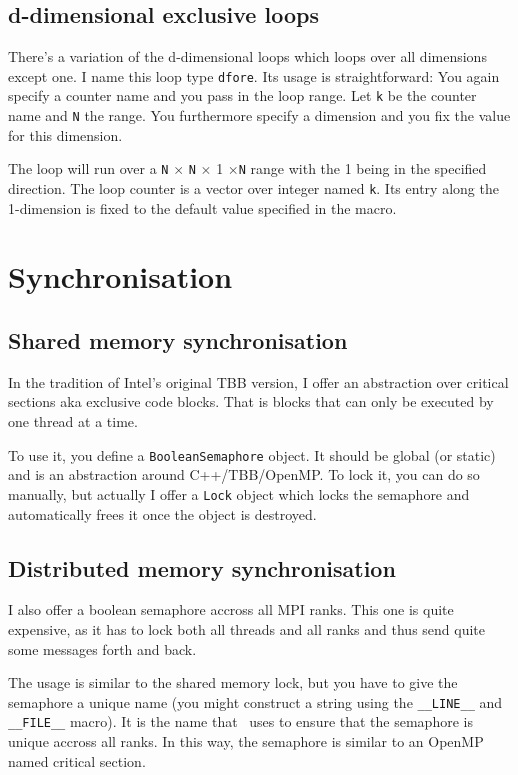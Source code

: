 \subsection{d-dimensional exclusive loops}

There's a variation of the d-dimensional loops which loops over all dimensions
except one.
I name this loop type \texttt{dfore}.
Its usage is straightforward: 
You again specify a counter name and you pass in the loop range. 
Let \texttt{k} be the counter name and \texttt{N} the range.
You furthermore specify a dimension and you fix the value for this dimension.

The loop will run over a \texttt{N} $\times $ \texttt{N} $\times $ 1 $\times
$\texttt{N} range with the 1 being in the specified direction.
The loop counter is a vector over integer named \texttt{k}.
Its entry along the 1-dimension is fixed to the default value specified in the
macro.


\section{Synchronisation}

\subsection{Shared memory synchronisation}

In the tradition of Intel's original TBB version, I offer an abstraction over
critical sections aka exclusive code blocks.
That is blocks that can only be executed by one thread at a time.

To use it, you define a \texttt{BooleanSemaphore} object.
It should be global (or static) and is an abstraction around C++/TBB/OpenMP.
To lock it, you can do so manually, but actually I offer a \texttt{Lock} object
which locks the semaphore and automatically frees it once the object is
destroyed.

\subsection{Distributed memory synchronisation}

I also offer a boolean semaphore accross all MPI ranks. This one is quite
expensive, as it has to lock both all threads and all ranks and thus send
quite some messages forth and back. 

The usage is similar to the shared memory lock, but you have to give the
semaphore a unique name (you might construct a string using the
\texttt{\_\_LINE\_\_} and \texttt{\_\_FILE\_\_} macro). 
It is the name that \Peano\ uses to ensure that the semaphore is unique accross
all ranks.
In this way, the semaphore is similar to an OpenMP named critical section.
